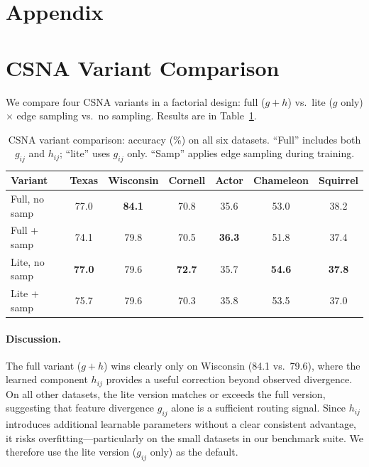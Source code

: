 \documentclass[runningheads]{llncs}
\begin{document}



\appendix
\section*{Appendix}

\section{CSNA Variant Comparison}\label{app:variants}

We compare four CSNA variants in a factorial design: full ($g+h$) vs.\ lite ($g$ only) $\times$ edge sampling vs.\ no sampling.
Results are in Table~\ref{tab:variants}.

\begin{table}[h]
\caption{CSNA variant comparison: accuracy (\%) on all six datasets. ``Full'' includes both $g_{ij}$ and $h_{ij}$; ``lite'' uses $g_{ij}$ only. ``Samp'' applies edge sampling during training.}\label{tab:variants}
\centering
\small
\begin{tabular}{lcccccc}
\toprule
Variant & Texas & Wisconsin & Cornell & Actor & Chameleon & Squirrel \\
\midrule
Full, no samp & 77.0 & \textbf{84.1} & 70.8 & 35.6 & 53.0 & 38.2 \\
Full + samp & 74.1 & 79.8 & 70.5 & \textbf{36.3} & 51.8 & 37.4 \\
Lite, no samp & \textbf{77.0} & 79.6 & \textbf{72.7} & 35.7 & \textbf{54.6} & \textbf{37.8} \\
Lite + samp & 75.7 & 79.6 & 70.3 & 35.8 & 53.5 & 37.0 \\
\bottomrule
\end{tabular}
\end{table}

\paragraph{Discussion.}
The full variant ($g+h$) wins clearly only on Wisconsin (84.1 vs.\ 79.6), where the learned component $h_{ij}$ provides a useful correction beyond observed divergence.
On all other datasets, the lite version matches or exceeds the full version, suggesting that feature divergence $g_{ij}$ alone is a sufficient routing signal.
Since $h_{ij}$ introduces additional learnable parameters without a clear consistent advantage, it risks overfitting---particularly on the small datasets in our benchmark suite.
We therefore use the lite version ($g_{ij}$ only) as the default.
\end{document}
